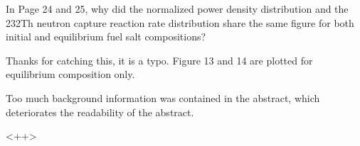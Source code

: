 \documentclass[answers,11pt]{exam}
\begin{document}
\begin{questions}
        \question  In Page 24 and 25, why did the normalized power density 
        distribution and the 232Th neutron capture reaction rate distribution 
        share the same figure for both initial and equilibrium fuel salt 
        compositions?
        \begin{solution}
                Thanks for catching this, it is a typo. Figure 13 and 14 are plotted 
                for equilibrium composition only.            	    
        \end{solution}

        \question  Too much background information was contained in the 
        abstract, which deteriorates the readability of the abstract.
        \begin{solution}
                <++>
        \end{solution}

\end{questions}
%
%
\end{document}
